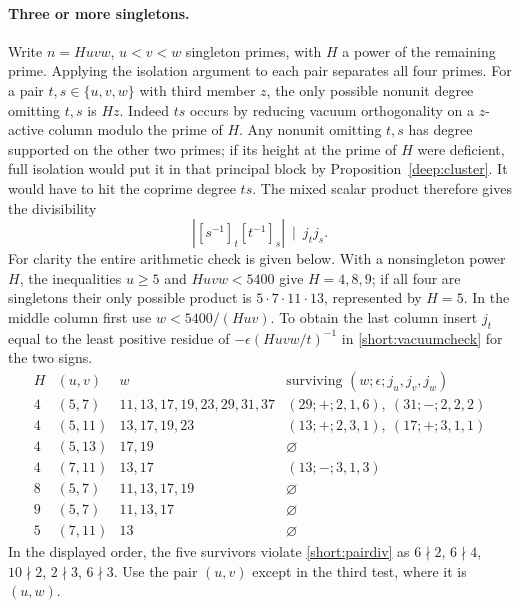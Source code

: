 \documentclass[11pt,a4paper]{article}
\numberwithin{equation}{section}
\theoremstyle{remark}
\begin{document}
\paragraph{Three or more singletons.}
Write $n=Huvw$, $u<v<w$ singleton primes, with $H$ a power of the
remaining prime. Applying the isolation argument to each pair
separates all four primes. For a pair $t,s\in\{u,v,w\}$ with third
member $z$, the only possible nonunit degree omitting $t,s$ is $Hz$.
Indeed $ts$ occurs by reducing vacuum orthogonality on a $z$-active
column modulo the prime of $H$. Any nonunit omitting $t,s$ has degree
supported on the other two primes; if its height at the prime of $H$
were deficient, full isolation would put it in that principal block
by Proposition~\ref{deep:cluster}. It would have to hit the coprime
degree $ts$. The mixed scalar product therefore gives the divisibility
\begin{equation}\label{short:pairdiv}
          |[s^{-1}]_t[t^{-1}]_s|\ \mid\ j_tj_s .
\end{equation}
For clarity the entire arithmetic check is given below. With a
nonsingleton power $H$, the inequalities $u\ge5$ and $Huvw<5400$
give $H=4,8,9$; if all four are singletons their only possible product
is $5\cdot7\cdot11\cdot13$, represented by $H=5$.
In the middle column first use $w<5400/(Huv)$. To obtain the last
column insert $j_t$ equal to the least positive residue of
$-\epsilon(Huvw/t)^{-1}$ in \eqref{short:vacuumcheck} for the two signs.
\[
\begin{array}{cc|l|l}
H&(u,v)&w&\text{surviving }(w;\epsilon;j_u,j_v,j_w)\\\hline
4&(5,7)&11,13,17,19,23,29,31,37&(29;+;2,1,6),\ (31;-;2,2,2)\\
4&(5,11)&13,17,19,23&(13;+;2,3,1),\ (17;+;3,1,1)\\
4&(5,13)&17,19&\varnothing\\
4&(7,11)&13,17&(13;-;3,1,3)\\
8&(5,7)&11,13,17,19&\varnothing\\
9&(5,7)&11,13,17&\varnothing\\
5&(7,11)&13&\varnothing
\end{array}
\]
In the displayed order, the five survivors violate \eqref{short:pairdiv}
as $6\nmid2$, $6\nmid4$, $10\nmid2$, $2\nmid3$, $6\nmid3$.
Use the pair $(u,v)$ except in the third test, where it is $(u,w)$.
\end{document}

